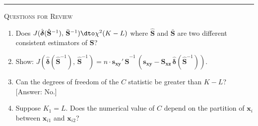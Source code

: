\bigskip
\begin{center}\rule{0.6\textwidth}{0.4pt}\end{center}
\noindent\textsc{Questions for Review}
\medskip

\begin{enumerate}
\item Does
  $J(\hat{\boldsymbol{\delta}}(\hat{\mathbf{S}}^{-1}),\, \bar{\mathbf{S}}^{-1})
  \dto \chi^2(K - L)$ where $\hat{\mathbf{S}}$ and $\bar{\mathbf{S}}$ are two different consistent
  estimators of $\mathbf{S}$?

\item Show:
  $J(\hat{\boldsymbol{\delta}}(\hat{\mathbf{S}}^{-1}),\, \hat{\mathbf{S}}^{-1})
  = n \cdot \mathbf{s}_{\mathbf{xy}}'\, \hat{\mathbf{S}}^{-1}\,
  (\mathbf{s}_{\mathbf{xy}} - \mathbf{S}_{\mathbf{xz}}\,
  \hat{\boldsymbol{\delta}}(\hat{\mathbf{S}}^{-1}))$.

\item Can the degrees of freedom of the $C$ statistic be greater than $K - L$?
  [Answer: No.]

\item Suppose $K_1 = L$.  Does the numerical value of $C$ depend on the partition of
  $\mathbf{x}_i$ between $\mathbf{x}_{i1}$ and $\mathbf{x}_{i2}$?
\end{enumerate}
